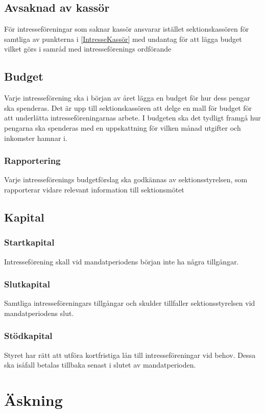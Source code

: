 \documentclass[a4paper]{dtek}
\begin{document}
\subsection{Avsaknad av kassör}
För intresseföreningar som saknar kassör ansvarar istället sektionskassören för samtliga av punkterna i \ref{IntresseKassör} med undantag för att lägga budget vilket görs i samråd med intresseförenings ordförande

\subsection{Budget}\label{IntresseBudget}
Varje intresseförening ska i början av året lägga en budget för hur dess pengar ska spenderas.
Det är upp till sektionskassören att delge en mall för budget för att underlätta intresseföreningarnas arbete.
I budgeten ska det tydligt framgå hur pengarna ska spenderas med en uppskattning för vilken månad utgifter och inkomster hamnar i.

\subsubsection{Rapportering}
Varje intresseförenings budgetförslag ska godkännas av sektionsstyrelsen, som rapporterar vidare relevant information till sektionsmötet

\subsection{Kapital}
\subsubsection{Startkapital}
Intresseförening skall vid mandatperiodens början inte ha några tillgångar.
\subsubsection{Slutkapital}
Samtliga intresseföreningars tillgångar och skulder tillfaller sektionsstyrelsen vid mandatperiodens slut.
\subsubsection{Stödkapital}
Styret har rätt att utföra kortfristiga lån till intresseföreningar vid behov.
Dessa ska isåfall betalas tillbaka senast i slutet av mandatperioden.

\section{Äskning}
\end{document}
